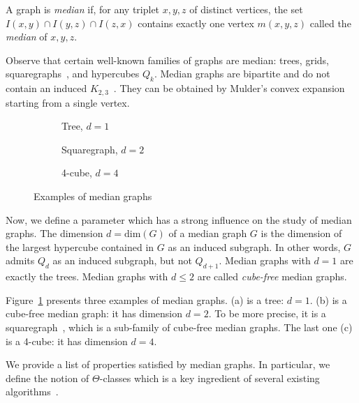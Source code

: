\documentclass[a4paper,UKenglish,numberwithinsect,cleveref, autoref,anonymous]{lipics-v2021}
\begin{document}
\begin{definition}
A graph is \textit{median} if, for any triplet $x,y,z$ of distinct vertices, the set $I(x,y) \cap I(y,z) \cap I(z,x)$ contains exactly one vertex $m(x,y,z)$ called the \emph{median} of $x,y,z$.
\label{def:median}
\end{definition}

Observe that certain well-known families of graphs are median: trees, grids, squaregraphs~\cite{BaChEp10}, and hypercubes $Q_k$.
Median graphs are bipartite and do not contain an induced $K_{2,3}$~\cite{BaCh08,HaImKl11,Mu78}. They can be obtained by Mulder's convex expansion~\cite{Mu78,Mu80} starting from a single vertex.

\begin{figure}[h]

\begin{subfigure}[b]{0.32\columnwidth}
\centering
\scalebox{0.6}{}
\caption{Tree, $d=1$}
\end{subfigure}
\begin{subfigure}[b]{0.32\columnwidth}
\centering
\scalebox{0.6}{}
\caption{Squaregraph, $d=2$}
\end{subfigure}
\begin{subfigure}[b]{0.32\columnwidth}
\centering
\scalebox{0.6}{}
\caption{4-cube, $d=4$}
\end{subfigure}

\caption{Examples of median graphs}
\label{fig:median_examples}
\end{figure}

Now, we define a parameter which has a strong influence on the study of median graphs.
The dimension $d = \mbox{dim}(G)$ of a median graph $G$ is the dimension of the largest hypercube contained in $G$ as an induced subgraph.
In other words, $G$ admits $Q_d$ as an induced subgraph, but not $Q_{d+1}$. Median graphs with $d=1$ are exactly the trees. Median graphs with $d\le 2$ are called \textit{cube-free} median graphs.

Figure~\ref{fig:median_examples} presents three examples of median graphs. (a) is a tree: $d=1$. (b) is a cube-free median graph: it has dimension $d=2$. To be more precise, it is a squaregraph~\cite{BaChEp10}, which is a sub-family of cube-free median graphs. The last one (c) is a 4-cube: it has dimension $d=4$. 

We provide a list of properties satisfied by median graphs. In particular, we define the notion of $\Theta$-classes which is a key ingredient of several existing algorithms~\cite{BeChChVa20,HaImKl99,ImKlMu99}.
\end{document}

